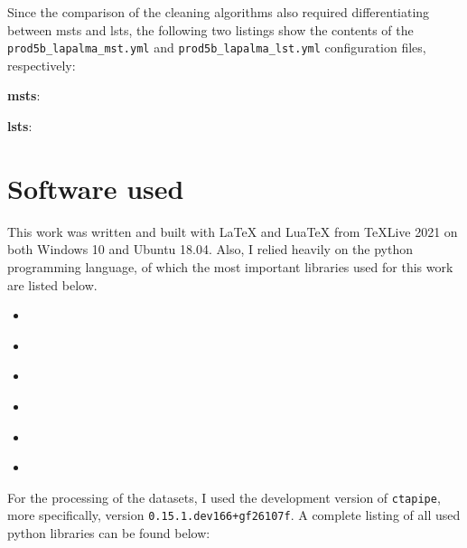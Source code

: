 Since the comparison of the cleaning algorithms also required differentiating between \glspl{mst}
and \glspl{lst}, the following two listings show the contents of the \texttt{prod5b\_lapalma\_mst.yml} and
\texttt{prod5b\_lapalma\_lst.yml} configuration files, respectively:
\begin{description}
    \item \textbf{\glspl{mst}}:\medskip
    \begin{spacing}{0.5}
        \begin{mdframed}[backgroundcolor=codebg, hidealllines=true, leftmargin=0cm,rightmargin=0cm, skipabove=0pt, innerleftmargin=0,innerrightmargin=0,]
        
        \end{mdframed}
    \end{spacing}

    \item \textbf{\glspl{lst}}:\medskip
    \begin{spacing}{0.5}
        \begin{mdframed}[backgroundcolor=codebg, hidealllines=true, leftmargin=0cm,rightmargin=0cm, skipabove=0pt, innerleftmargin=0,innerrightmargin=0,]
        
        \end{mdframed}
    \end{spacing}
\end{description}


\section{Software used}

This work was written and built with \LaTeX{} and Lua\TeX{} from \TeX Live 2021 on both Windows 10 and Ubuntu 18.04.
Also, I relied heavily on the python programming language, of which the most important libraries used
for this work are listed below.
\begin{itemize}
    \item \numpy{}~\cite{numpy}
    \item \pandas{}~\cite{pandas}
    \item \matplotlib{}~\cite{matplotlib}
    \item \astropy{}~\cite{astropy1, astropy2}
    \item \pyirf{}~\cite{pyirf}
    \item \sklearn{}~\cite{scikit-learn}
\end{itemize}

For the processing of the datasets, I used the development version of \texttt{ctapipe}, more specifically, version
\texttt{0.15.1.dev166+gf26107f}. A complete listing of all used python libraries can be found below:
\begin{spacing}{0.5}
    \begin{mdframed}[backgroundcolor=codebg, hidealllines=true, leftmargin=0cm,rightmargin=0cm, skipabove=0pt, innerleftmargin=0,innerrightmargin=0,]
    
    \end{mdframed}
\end{spacing}
